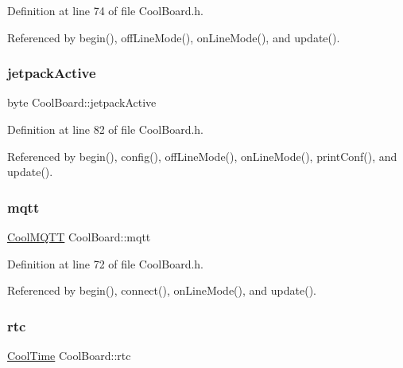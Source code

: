 Definition at line 74 of file Cool\+Board.\+h.



Referenced by begin(), off\+Line\+Mode(), on\+Line\+Mode(), and update().

\mbox{\label{classCoolBoard_a4dc6ff276ed178975bd8b459fa7421dc}} 
\subsubsection{\texorpdfstring{jetpack\+Active}{jetpackActive}}
{\footnotesize\ttfamily byte Cool\+Board\+::jetpack\+Active\hspace{0.3cm}{\ttfamily [private]}}



Definition at line 82 of file Cool\+Board.\+h.



Referenced by begin(), config(), off\+Line\+Mode(), on\+Line\+Mode(), print\+Conf(), and update().

\mbox{\label{classCoolBoard_a2399f44d7c23c1149a335cb3b46d90f1}} 
\subsubsection{\texorpdfstring{mqtt}{mqtt}}
{\footnotesize\ttfamily \hyperlink{classCoolMQTT}{Cool\+M\+Q\+TT} Cool\+Board\+::mqtt\hspace{0.3cm}{\ttfamily [private]}}



Definition at line 72 of file Cool\+Board.\+h.



Referenced by begin(), connect(), on\+Line\+Mode(), and update().

\mbox{\label{classCoolBoard_a50d2a6716879d64a85f3c6b44ad63275}} 
\subsubsection{\texorpdfstring{rtc}{rtc}}
{\footnotesize\ttfamily \hyperlink{classCoolTime}{Cool\+Time} Cool\+Board\+::rtc\hspace{0.3cm}{\ttfamily [private]}}



